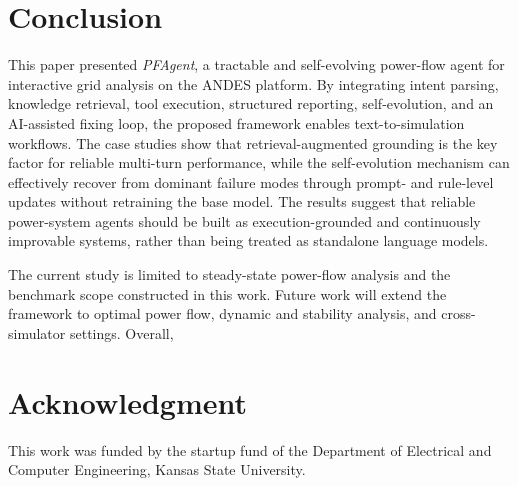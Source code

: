 \documentclass[journal]{IEEEtran}
\begin{document}

\section{Conclusion}
\label{sec:conclusion}

This paper presented \emph{PFAgent}, a tractable and self-evolving power-flow agent for interactive grid analysis on the ANDES platform.
By integrating intent parsing, knowledge retrieval, tool execution, structured reporting, self-evolution, and an AI-assisted fixing loop, the proposed framework enables text-to-simulation workflows.
The case studies show that retrieval-augmented grounding is the key factor for reliable multi-turn performance, while the self-evolution mechanism can effectively recover from dominant failure modes through prompt- and rule-level updates without retraining the base model.
The results suggest that reliable power-system agents should be built as execution-grounded and continuously improvable systems, rather than being treated as standalone language models.

The current study is limited to steady-state power-flow analysis and the benchmark scope constructed in this work.
Future work will extend the framework to optimal power flow, dynamic and stability analysis, and cross-simulator settings. Overall, 


\section*{Acknowledgment}

This work was funded by the startup fund of the Department of Electrical and Computer Engineering, Kansas State University.





\end{document}
